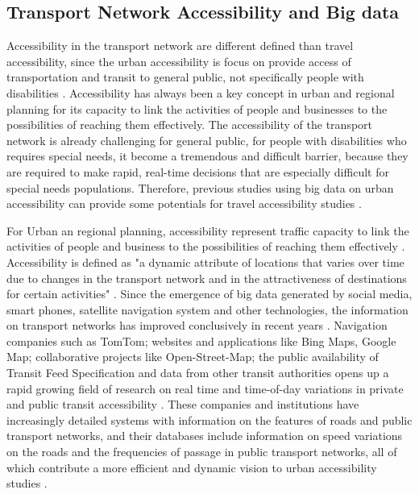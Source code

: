 \subsection{Transport Network Accessibility and Big data}
Accessibility in the transport network are different defined than travel accessibility, since the urban accessibility is focus on provide access of transportation and transit to general public, not specifically people with disabilities \cite{moya2016dynamic}. Accessibility has always been a key concept in urban and regional planning for its capacity to link the activities of people and businesses to the possibilities of reaching them effectively. The accessibility of the transport network is already challenging for general public, for people with disabilities who requires special needs, it become a tremendous and difficult barrier, because they are required to make rapid, real-time decisions that are
especially difficult for special needs populations. Therefore, previous studies using big data on urban accessibility can provide some potentials for travel accessibility studies \cite{Barbeau}.

For Urban an regional planning, accessibility represent traffic capacity to link the activities of people and business to the possibilities of reaching them effectively \cite{moya2016dynamic}. Accessibility is defined as "a dynamic attribute of locations that varies over time due to changes in the transport network and in the attractiveness of destinations for certain activities" \cite{moya2016dynamic}. Since the emergence of big data generated by social media, smart phones, satellite navigation system and other technologies,  the information on transport networks has improved conclusively in recent years \cite{Barbeau}. Navigation companies such as TomTom; websites and applications like Bing Maps, Google Map; collaborative projects like Open-Street-Map; the public availability of Transit Feed Specification and data from other transit authorities opens up a rapid growing field of research on real time and time-of-day variations in private and public transit accessibility \cite{moya2016dynamic}. These companies and institutions have increasingly detailed systems with information on the features of roads and public transport networks, and their databases include information on speed variations on the roads and the frequencies of passage in public transport networks, all of which contribute a more efficient and dynamic vision to urban accessibility studies \cite{moya2016dynamic}.

